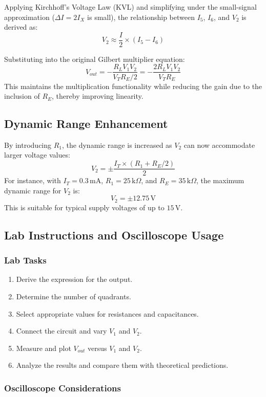 \documentclass[a4paper,9pt,twoside,openany,twocolumn]{memoir}
\begin{document}
Applying Kirchhoff's Voltage Law (KVL) and simplifying under the small-signal approximation ($\Delta I = 2I_X$ is small), the relationship between $I_5$, $I_6$, and $V_2$ is derived as:
\[
V_2 \approx \frac{I}{2} \times (I_5 - I_6)
\]

Substituting into the original Gilbert multiplier equation:
\[
V_{out} = -\frac{R_L V_1 V_2}{V_T R_E/2} = -\frac{2R_L V_1 V_2}{V_T R_E}
\]
This maintains the multiplication functionality while reducing the gain due to the inclusion of $R_E$, thereby improving linearity.

\subsection{Dynamic Range Enhancement}

By introducing $R_1$, the dynamic range is increased as $V_2$ can now accommodate larger voltage values:
\[
V_2 = \pm \frac{I_T \times (R_1 + R_E/2)}{2}
\]
For instance, with $I_T = 0.3\,\text{mA}$, $R_1 = 25\,\text{k}\Omega$, and $R_E = 35\,\text{k}\Omega$, the maximum dynamic range for $V_2$ is:
\[
V_2 = \pm 12.75\,\text{V}
\]
This is suitable for typical supply voltages of up to $15\,\text{V}$.

\subsection{Lab Instructions and Oscilloscope Usage}

\subsubsection{Lab Tasks}
\begin{enumerate}
    \item Derive the expression for the output.
    \item Determine the number of quadrants.
    \item Select appropriate values for resistances and capacitances.
    \item Connect the circuit and vary $V_1$ and $V_2$.
    \item Measure and plot $V_{out}$ versus $V_1$ and $V_2$.
    \item Analyze the results and compare them with theoretical predictions.
\end{enumerate}

\subsubsection{Oscilloscope Considerations}
\end{document}
